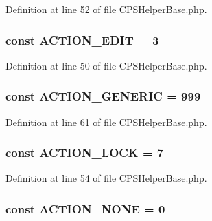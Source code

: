 Definition at line 52 of file CPSHelperBase.php.

\hypertarget{classCPSHelperBase_ab9acf282db5918a797e09e1fa108ae9e}{
\subsubsection[{ACTION\_\-EDIT}]{\setlength{\rightskip}{0pt plus 5cm}const {\bf ACTION\_\-EDIT} = 3}}
\label{classCPSHelperBase_ab9acf282db5918a797e09e1fa108ae9e}


Definition at line 50 of file CPSHelperBase.php.

\hypertarget{classCPSHelperBase_ab18109cf2120c7f61450d656a4700fff}{
\subsubsection[{ACTION\_\-GENERIC}]{\setlength{\rightskip}{0pt plus 5cm}const {\bf ACTION\_\-GENERIC} = 999}}
\label{classCPSHelperBase_ab18109cf2120c7f61450d656a4700fff}


Definition at line 61 of file CPSHelperBase.php.

\hypertarget{classCPSHelperBase_af1b57d540e52e105bcb81d4482546cba}{
\subsubsection[{ACTION\_\-LOCK}]{\setlength{\rightskip}{0pt plus 5cm}const {\bf ACTION\_\-LOCK} = 7}}
\label{classCPSHelperBase_af1b57d540e52e105bcb81d4482546cba}


Definition at line 54 of file CPSHelperBase.php.

\hypertarget{classCPSHelperBase_a14ebb74e919040ff6ae640a85e26ad80}{
\subsubsection[{ACTION\_\-NONE}]{\setlength{\rightskip}{0pt plus 5cm}const {\bf ACTION\_\-NONE} = 0}}
\label{classCPSHelperBase_a14ebb74e919040ff6ae640a85e26ad80}


